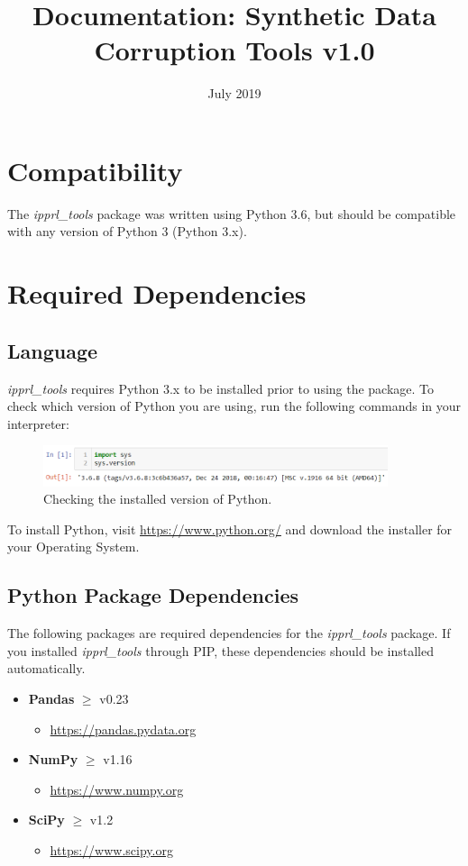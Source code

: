 \documentclass[titlepage, 11pt]{article}
\title{\pkgname{} Documentation: Synthetic Data Corruption Tools v1.0}
\date{July 2019}
\newcommand{\pkgname}{\textit{ipprl\_tools}}
\begin{document}
\maketitle

\tableofcontents
\section{Compatibility}
The \pkgname{} package was written using Python 3.6, but should be compatible with any version of Python 3 (Python 3.x).

\section{Required Dependencies}

\subsection{Language}
\pkgname{} requires Python 3.x to be installed prior to using the package. To check which version of Python you are using, run the following commands in your interpreter:
\begin{figure}[H]
    \centering
    \includegraphics[width=0.9\textwidth]{imgs/Python_ver.PNG}
    \caption{Checking the installed version of Python.}
    \label{fig:pythver}
\end{figure}

\noindent To install Python, visit \url{https://www.python.org/} and download the installer for your Operating System.

\subsection{Python Package Dependencies}
The following packages are required dependencies for the \pkgname{} package. If you installed \pkgname{} through PIP, these dependencies should be installed automatically.

    \begin{itemize}
        \item \textbf{Pandas} $\geq$ v0.23
        \begin{itemize}
            \item \url{https://pandas.pydata.org}
        \end{itemize}
        \item \textbf{NumPy} $\geq$ v1.16
        \begin{itemize}
            \item \url{https://www.numpy.org}
        \end{itemize}
        \item \textbf{SciPy} $\geq$ v1.2
        \begin{itemize}
            \item \url{https://www.scipy.org}
        \end{itemize}
    \end{itemize}
\end{document}
